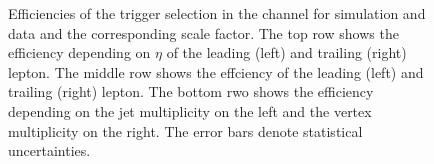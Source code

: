 \begin{figure}[htbp!]
\begin{center}
      \caption{Efficiencies of the trigger selection in the \ee channel for simulation and data and the corresponding scale factor. The top row shows the efficiency depending on $\eta$ of the leading (left) and trailing (right) lepton. The middle row shows the effciency \pt of the leading (left) and trailing (right) lepton. The bottom rwo shows the efficiency depending on the jet multiplicity on the left and the vertex multiplicity on the right.
       The error bars denote statistical uncertainties. }  
      
    \label{fig:MET_ee}
  \end{center}
\end{figure}

\begin{figure}[htbp!]
  \begin{center}

\end{center}
\end{figure}

